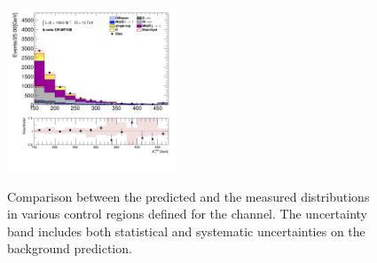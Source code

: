 \begin{figure}[!htp]
\begin{center}
			\includegraphics[width=0.45\textwidth]{chapters/chapter6_HPlus/images/taujets/met_et_BVETO_MT100.png} \\
			\end{center}
			\caption{
			Comparison between the predicted and the measured \Etm distributions in various control regions defined for the \taujets channel. The uncertainty band includes both statistical and systematic uncertainties on the background prediction. 
			}
			\label{fig:bkg-met-taujets}
		\end{figure}

